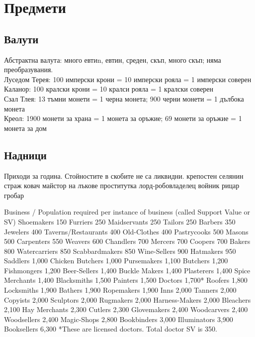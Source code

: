 \section{Предмети}
\subsection{Валути}
Абстрактна валута: много евтиn, евтин, среден, скъп, много скъп; няма преобразувания.  \\
Луседом Терея: 100 имперски крони = 10 имперски рояла = 1 имперски соверен             \\
Каланор: 100 кралски крони = 10 кралси рояла = 1 кралски соверен                       \\
Сзал Тлея: 13 тъмни монети = 1 черна монета; 900 черни монети = 1 дълбока монета       \\
Креол: 1900 монети за храна = 1 монета за оръжие; 69 монети за оръжие = 1 монета за дом

\subsection{Надници}
Приходи за година. Стойностите в скобите не са ликвидни.
крепостен селянин
страж
ковач
майстор на лъкове
проститутка
лорд-робовладелец
войник
рицар
гробар

Business / Population required per instance of business (called Support Value or SV)
Shoemakers     150
Furriers      250
Maidservants     250
Tailors                   250
Barbers                   350
Jewelers     400
Taverns/Restaurants  400
Old-Clothes     400
Pastrycooks     500
Masons                   500
Carpenters     550
Weavers     600
Chandlers     700
Mercers     700
Coopers     700
Bakers                   800
Watercarriers     850
Scabbardmakers   850
Wine-Sellers     900
Hatmakers     950
Saddlers     1,000
Chicken Butchers  1,000
Pursemakers     1,100
Butchers     1,200
Fishmongers     1,200
Beer-Sellers     1,400
Buckle Makers     1,400
Plasterers     1,400
Spice Merchants   1,400
Blacksmiths     1,500
Painters     1,500
Doctors                   1,700*
Roofers       1,800
Locksmiths     1,900
Bathers                   1,900
Ropemakers     1,900
Inns                   2,000
Tanners                   2,000
Copyists    2,000
Sculptors    2,000
Rugmakers    2,000
Harness-Makers  2,000
Bleachers    2,100
Hay Merchants    2,300
Cutlers                  2,300
Glovemakers   2,400
Woodcarvers   2,400
Woodsellers   2,400
Magic-Shops   2,800
Bookbinders   3,000
Illuminators   3,900
Booksellers   6,300
*These are licensed doctors. Total doctor SV is 350.

